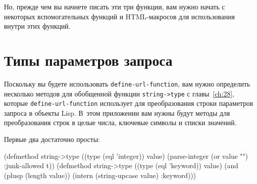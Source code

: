 Но, прежде чем вы начнете писать эти три функции, вам нужно начать с некоторых
вспомогательных функций и HTML-макросов для использования внутри этих функций.

\section{Типы параметров запроса}

Поскольку вы будете использовать \lstinline{define-url-function}, вам нужно определить
несколько методов для обобщенной функции \lstinline{string->type} с главы~\ref{ch:28},
которые \lstinline{define-url-function} использует для преобразования строки параметров
запроса в объекты Lisp. В~этом приложении вам нужны будут методы для преобразования строк
в целые числа, ключевые символы и списки значений.

Первые два достаточно просты:

\begin{myverb}
(defmethod string->type ((type (eql 'integer)) value)
  (parse-integer (or value "") :junk-allowed t))
(defmethod string->type ((type (eql 'keyword)) value)
  (and (plusp (length value)) (intern (string-upcase value) :keyword)))
\end{myverb}

